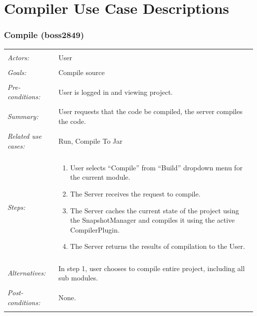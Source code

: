 \documentclass[11pt]{article}
\begin{document}
\section{Compiler Use Case Descriptions}
\subsubsection{Compile (boss2849)}
\begin{tabular}{ p{2cm} p{12cm} }
 \hline
 \\
 \textit{Actors:} & User \\ 
 \\
 \textit{Goals:} & Compile source \\
 \\
 \textit{Pre-conditions:} & User is logged in and viewing project. \\
 \\
 \textit{Summary:} & User requests that the code be compiled, the server compiles the code. \\
 \\
 \textit{Related use cases:} & Run, Compile To Jar \\ 
 \\
 \textit{Steps:} & \begin{enumerate}
   \item User selects ``Compile'' from ``Build'' dropdown menu for the current module.
   \item The Server receives the request to compile.
   \item The Server caches the current state of the project using the SnapshotManager and compiles it using the active CompilerPlugin.
   \item The Server returns the results of compilation to the User.
 \end{enumerate} \\
 \\
 \textit{Alternatives:} & In step 1, user chooses to compile entire project, including all sub modules. \\
 \\
 \textit{Post-conditions:} & None. \\
 \\
\hline
\end{tabular}
\end{document}
